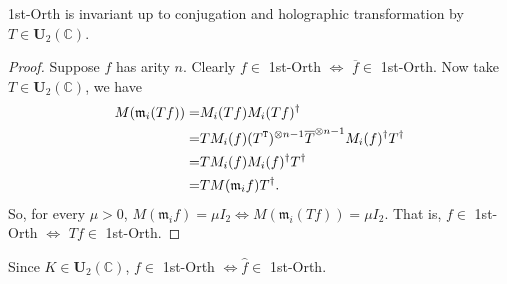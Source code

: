 \begin{proposition}\label{prop: invariant 1st-Orth}
    {\sc 1st-Orth} is invariant up to conjugation and holographic transformation by $T\in \mathbf{U}_2(\mathbb{C})$.
\end{proposition}

\begin{proof}
    Suppose $f$ has arity $n$.
    Clearly $f\in$ {\sc 1st-Orth} $\iff $ $\overline{f}\in$ {\sc 1st-Orth}.
    Now take $T\in \mathbf{U}_2(\mathbb{C})$, we have
    \begin{equation*}
        \begin{aligned}
            M(\mathfrak m_i (Tf))
            =&M_i(Tf)M_i(Tf)^{\dagger}\\
            =&TM_i(f)(T^{\tt T})^{\otimes n-1}\overline{T}^{\otimes n-1}M_i(f)^\dagger T^\dagger\\
            =&TM_i(f)M_i(f)^\dagger T^\dagger\\
            =&TM(\mathfrak m_i f)T^\dagger.\\
        \end{aligned}
    \end{equation*}
    So, for every $\mu>0$, $M(\mathfrak m_i f)=\mu I_2 \iff M(\mathfrak m_i (Tf))=\mu I_2$.
    That is, $f\in$ {\sc 1st-Orth} $\iff $ $Tf\in$ {\sc 1st-Orth}.
\end{proof}

\begin{remark}
    Since $K\in \mathbf{U}_2(\mathbb{C})$, $f\in$ {\sc 1st-Orth} $\iff \widehat{f}\in $ {\sc 1st-Orth}.
\end{remark}

